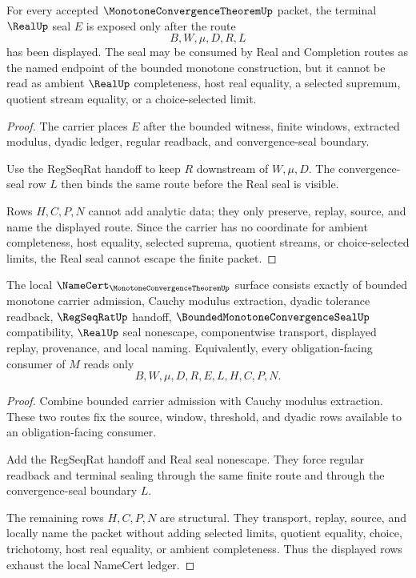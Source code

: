 \begin{theorem}
\label{thm:monotone-convergence-theorem-real-seal-nonescape}
For every accepted $\MonotoneConvergenceTheoremUp$ packet, the terminal $\RealUp$ seal $E$ is exposed only after the route
$$
B,W,\mu,D,R,L
$$
has been displayed. The seal may be consumed by Real and Completion routes as the named endpoint of the bounded monotone construction, but it cannot be read as ambient $\RealUp$ completeness, host real equality, a selected supremum, quotient stream equality, or a choice-selected limit.
\end{theorem}
\begin{proof}
The carrier places $E$ after the bounded witness, finite windows, extracted modulus, dyadic ledger, regular readback, and convergence-seal boundary.

Use the RegSeqRat handoff to keep $R$ downstream of $W,\mu,D$. The convergence-seal row $L$ then binds the same route before the Real seal is visible.

Rows $H,C,P,N$ cannot add analytic data; they only preserve, replay, source, and name the displayed route. Since the carrier has no coordinate for ambient completeness, host equality, selected suprema, quotient streams, or choice-selected limits, the Real seal cannot escape the finite packet.
\end{proof}

\begin{theorem}
\label{thm:monotone-convergence-theorem-ledger-exactness}
The local $\NameCert_{\MonotoneConvergenceTheoremUp}$ surface consists exactly of bounded monotone carrier admission, Cauchy modulus extraction, dyadic tolerance readback, $\RegSeqRatUp$ handoff, $\BoundedMonotoneConvergenceSealUp$ compatibility, $\RealUp$ seal nonescape, componentwise transport, displayed replay, provenance, and local naming. Equivalently, every obligation-facing consumer of $M$ reads only
$$
B,W,\mu,D,R,E,L,H,C,P,N .
$$
\end{theorem}
\begin{proof}
Combine bounded carrier admission with Cauchy modulus extraction. These two routes fix the source, window, threshold, and dyadic rows available to an obligation-facing consumer.

Add the RegSeqRat handoff and Real seal nonescape. They force regular readback and terminal sealing through the same finite route and through the convergence-seal boundary $L$.

The remaining rows $H,C,P,N$ are structural. They transport, replay, source, and locally name the packet without adding selected limits, quotient equality, choice, trichotomy, host real equality, or ambient completeness. Thus the displayed rows exhaust the local NameCert ledger.
\end{proof}

